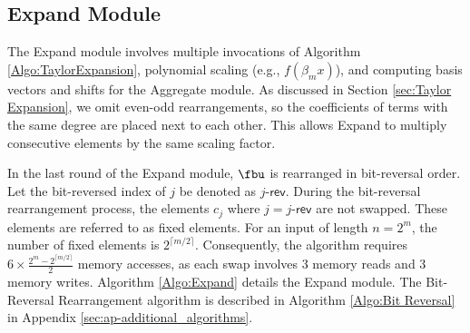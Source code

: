 \subsection{Expand Module}

The \textsf{Expand} module involves multiple invocations of Algorithm \ref{Algo:TaylorExpansion}, polynomial scaling (e.g., $f(\beta_m x)$), and computing basis vectors and shifts for the \textsf{Aggregate} module. 
As discussed in Section \ref{sec:Taylor Expansion}, we omit even-odd rearrangements, 
so the coefficients of terms with the same degree are placed next to each other. This allows \textsf{Expand} to multiply consecutive elements by the same scaling factor. 

In the last round of the \textsf{Expand} module, $\fbu$ is rearranged in bit-reversal order. Let the bit-reversed index of $j$ be denoted as $j\text{-}\mathsf{rev}$. During the bit-reversal rearrangement process, the elements \( c_j \) where \( j = j\text{-}\mathsf{rev} \) are not swapped. These elements are referred to as fixed elements. For an input of length \( n = 2^m \), the number of fixed elements is \( 2^{\lceil m/2 \rceil} \). Consequently, the algorithm requires \( 6 \times \frac{2^m - 2^{\lceil m/2 \rceil}}{2} \) memory accesses, as each swap involves 3 memory reads and 3 memory writes. Algorithm \ref{Algo:Expand} details the \textsf{Expand} module. The Bit-Reversal Rearrangement algorithm is described in Algorithm \ref{Algo:Bit Reversal} in Appendix \ref{sec:ap-additional_algorithms}.






